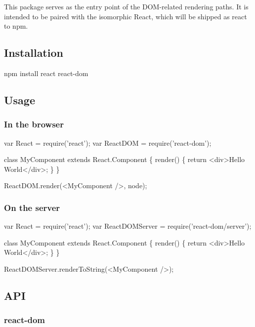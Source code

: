 This package serves as the entry point of the D\+O\+M-\/related rendering paths. It is intended to be paired with the isomorphic React, which will be shipped as {\ttfamily react} to npm.

\subsection*{Installation}


\begin{DoxyCode}
npm install react react-dom
\end{DoxyCode}


\subsection*{Usage}

\subsubsection*{In the browser}


\begin{DoxyCode}
var React = require('react');
var ReactDOM = require('react-dom');

class MyComponent extends React.Component \{
  render() \{
    return <div>Hello World</div>;
  \}
\}

ReactDOM.render(<MyComponent />, node);
\end{DoxyCode}


\subsubsection*{On the server}


\begin{DoxyCode}
var React = require('react');
var ReactDOMServer = require('react-dom/server');

class MyComponent extends React.Component \{
  render() \{
    return <div>Hello World</div>;
  \}
\}

ReactDOMServer.renderToString(<MyComponent />);
\end{DoxyCode}


\subsection*{A\+PI}

\subsubsection*{{\ttfamily react-\/dom}}


